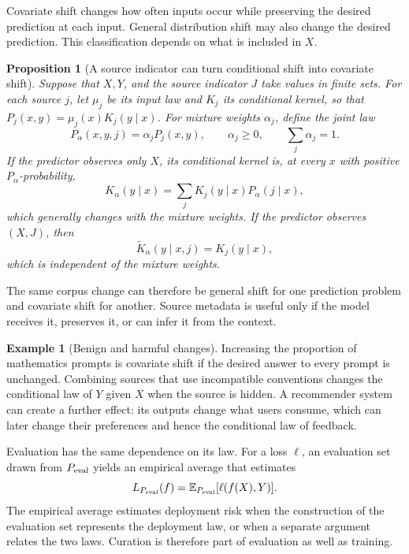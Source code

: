 \documentclass[11pt,twoside]{article}
\newcommand{\E}{\mathbb E}
\newtheorem{proposition}[theorem]{Proposition}
\theoremstyle{definition}
\newtheorem{example}[theorem]{Example}
\theoremstyle{remark}
\begin{document}
Covariate shift changes how often inputs occur while preserving the desired
prediction at each input. General distribution shift may also change the
desired prediction. This classification depends on what is included in $X$.

\begin{proposition}[A source indicator can turn conditional shift into covariate shift]
Suppose that $X,Y$, and the source indicator $J$ take values in finite sets.
For each source $j$, let $\mu_j$ be its input law and $K_j$ its conditional
kernel, so that $P_j(x,y)=\mu_j(x)K_j(y\mid x)$. For mixture weights
$\alpha_j$, define the joint law
\[
 P_\alpha(x,y,j)=\alpha_jP_j(x,y),
 \qquad \alpha_j\ge0,
 \qquad \sum_j\alpha_j=1.
\]
If the predictor observes only $X$, its conditional kernel is, at every $x$
with positive $P_\alpha$-probability,
\begin{equation}
 K_\alpha(y\mid x)=\sum_jK_j(y\mid x)P_\alpha(j\mid x),
 \label{eq:source-hidden}
\end{equation}
which generally changes with the mixture weights. If the predictor observes
$(X,J)$, then
\begin{equation}
 \widetilde K_\alpha(y\mid x,j)=K_j(y\mid x),
 \label{eq:source-visible}
\end{equation}
which is independent of the mixture weights.
\end{proposition}

The same corpus change can therefore be general shift for one prediction
problem and covariate shift for another. Source metadata is useful only if the
model receives it, preserves it, or can infer it from the context.

\begin{example}[Benign and harmful changes]
Increasing the proportion of mathematics prompts is covariate shift if the
desired answer to every prompt is unchanged. Combining sources that use
incompatible conventions changes the conditional law of $Y$ given $X$ when
the source is hidden. A
recommender system can create a further effect: its outputs change what users
consume, which can later change their preferences and hence the conditional
law of feedback.
\end{example}

Evaluation has the same dependence on its law. For a loss $\ell$, an
evaluation set drawn from $P_{\rm eval}$ yields an empirical average that estimates
\[
 L_{P_{\rm eval}}(f)=\E_{P_{\rm eval}}[\ell(f(X),Y)].
\]
The empirical average estimates deployment risk when the construction of the
evaluation set represents the deployment law, or when a separate argument
relates the two laws. Curation is therefore
part of evaluation as well as training.
\end{document}
